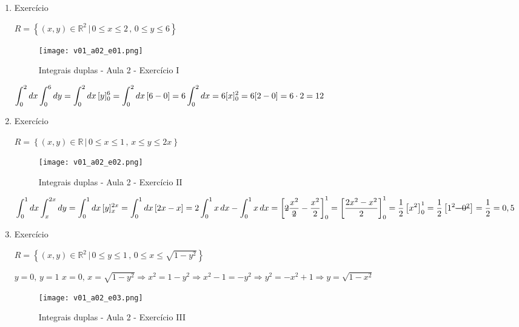 \begin{enumerate}
	\item Exercício
	
	$R = \left\{(x, y) \in \mathbb{R}^2 \,|\, 0 \leq x \leq 2 \,,\, 0 \leq y \leq 6 \right\}$
	
	\begin{figure}[H]
		\centering
		\texttt{[image: v01\_a02\_e01.png]}
		\caption{Integrais duplas - Aula 2 - Exercício I}
		\label{v01_a02_e01}
	\end{figure}
	
	$\displaystyle\int_0^2 dx \displaystyle\int_0^6 dy = \displaystyle\int_0^2 dx\, [y]_0^6 = \displaystyle\int_0^2 dx\, [6 - 0] = 6\displaystyle\int_0^2 dx = 6[x]_0^2 = 6[2 - 0] = 6 \cdot 2 = 12 $\newline
	
	\item Exercício
	
	$R = \left\{(x, y) \in \mathbb{R} \,|\, 0 \leq x \leq 1 \,,\, x \leq y \leq 2x \right\}$
						
	\begin{figure}[H]
		\centering
		\texttt{[image: v01\_a02\_e02.png]}
		\caption{Integrais duplas - Aula 2 - Exercício II}
		\label{v01_a02_e02}
	\end{figure}
	
	$\integral_0^1 dx \integral_{x}^{2x} dy = \integral_0^1 dx\, [y]_{x}^{2x} = \integral_0^1 dx\, [2x - x] = 2\integral_0^1 x\, dx - \integral_0^1 x\, dx = \left[\overstrike{2}\dfrac{x^2}{\overstrike{2}} - \dfrac{x^2}{2}\right]_0^1 = \left[\dfrac{2x^2 - x^2}{2}\right]_0^1 = \dfrac{1}{2}\left[x^2\right]_0^1 = \dfrac{1}{2}\left[1^2 \overstrike{- 0^2}\right] = \dfrac{1}{2} = 0,5 $\newline
	
	\item Exercício
	
	$R = \left\{(x, y) \in \mathbb{R}^2 \,|\, 0 \leq y \leq 1 \,,\, 0 \leq x \leq \sqrt{1 - y^2} \right\}$
	
	$y = 0,\, y=1$\newline
	$x = 0,\, x = \sqrt{1 - y^2} \Rightarrow x^2 = 1 - y^2 \Rightarrow x^2 - 1 = -y^2 \Rightarrow y^2 = -x^2 + 1 \Rightarrow y = \sqrt{1 -x^2}$
					
	\begin{figure}[H]
		\centering
		\texttt{[image: v01\_a02\_e03.png]}
		\caption{Integrais duplas - Aula 2 - Exercício III}
		\label{v01_a02_e03}
	\end{figure}
	

\end{enumerate}
